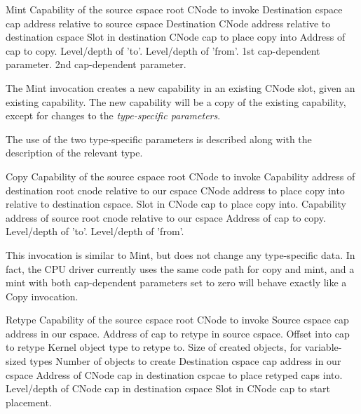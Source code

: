 \begin{invocation}{Mint}\label{sec:mint}
 \arg Capability of the source cspace root CNode to invoke
 \arg Destination cspace cap address relative to source cspace
 \arg Destination CNode address relative to destination cspace
 \arg Slot in destination CNode cap to place copy into
 \arg Address of cap to copy.
 \arg Level/depth of 'to'.
 \arg Level/depth of 'from'.
 \arg 1st cap-dependent parameter.
 \arg 2nd cap-dependent parameter.
\end{invocation}
The Mint invocation creates a new capability in an existing CNode
slot, given an existing capability.  The new capability will be a copy
of the existing capability, except for changes to the
\emph{type-specific parameters}.

The use of the two type-specific parameters is described along with
the description of the relevant type.

\begin{invocation}{Copy}
 \arg Capability of the source cspace root CNode to invoke
 \arg Capability address of destination root cnode relative to our cspace
 \arg CNode address to place copy into relative to destination cspace.
 \arg Slot in CNode cap to place copy into.
 \arg Capability address of source root cnode relative to our cspace
 \arg Address of cap to copy.
 \arg Level/depth of 'to'.
 \arg Level/depth of 'from'.
\end{invocation}
This invocation is similar to Mint, but does not change any
type-specific data. In fact, the CPU driver currently uses the same code path
for copy and mint, and a mint with both cap-dependent parameters set to zero
will behave exactly like a Copy invocation.

\begin{invocation}{Retype}
 \arg Capability of the source cspace root CNode to invoke
 \arg Source cspace cap address in our cspace.
 \arg Address of cap to retype in source cspace.
 \arg Offset into cap to retype
 \arg Kernel object type to retype to.
 \arg Size of created objects, for variable-sized types
 \arg Number of objects to create
 \arg Destination cspace cap address in our cspace
 \arg Address of CNode cap in destination cspcae to place retyped caps into.
 \arg Level/depth of CNode cap in destination cspace
 \arg Slot in CNode cap to start placement.
\end{invocation}


